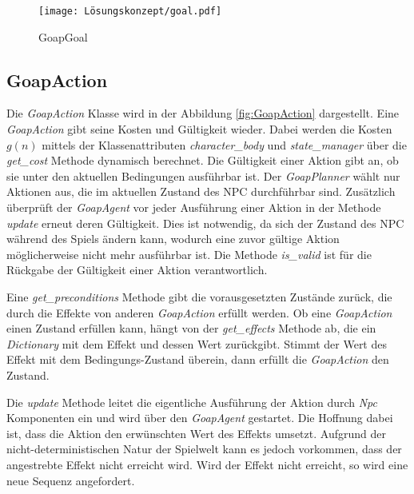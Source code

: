 \begin{figure}[t]
  \centering
  \texttt{[image: Lösungskonzept/goal.pdf]}
	\captionsetup{justification=justified, format=plain}
  \caption{GoapGoal}
  \label{fig:GoapGoal}
\end{figure}







\subsection{GoapAction}
\label{chap:goapaction uml}

Die \textit{GoapAction} Klasse wird in der Abbildung \ref{fig:GoapAction} dargestellt. Eine \textit{GoapAction} gibt seine Kosten und Gültigkeit wieder. Dabei werden die Kosten $g(n)$ mittels der Klassenattributen \textit{character\_body} und \textit{state\_manager} über die \textit{get\_cost} Methode dynamisch berechnet. Die Gültigkeit einer Aktion gibt an, ob sie unter den aktuellen Bedingungen ausführbar ist. Der \textit{GoapPlanner} wählt nur Aktionen aus, die im aktuellen Zustand des NPC durchführbar sind. Zusätzlich überprüft der \textit{GoapAgent} vor jeder Ausführung einer Aktion in der Methode \textit{update} erneut deren Gültigkeit. Dies ist notwendig, da sich der Zustand des NPC während des Spiels ändern kann, wodurch eine zuvor gültige Aktion möglicherweise nicht mehr ausführbar ist. Die Methode \textit{is\_valid} ist für die Rückgabe der Gültigkeit einer Aktion verantwortlich.

Eine \textit{get\_preconditions} Methode gibt die vorausgesetzten Zustände zurück, die durch die Effekte von anderen \textit{GoapAction} erfüllt werden. Ob eine \textit{GoapAction} einen Zustand erfüllen kann, hängt von der \textit{get\_effects} Methode ab, die ein \textit{Dictionary} mit dem Effekt und dessen Wert zurückgibt. Stimmt der Wert des Effekt mit dem Bedingungs-Zustand überein, dann erfüllt die \textit{GoapAction} den Zustand.

Die \textit{update} Methode leitet die eigentliche Ausführung der Aktion durch \textit{Npc} Komponenten ein und wird über den \textit{GoapAgent} gestartet. Die Hoffnung dabei ist, dass die Aktion den erwünschten Wert des Effekts umsetzt. Aufgrund der nicht-deterministischen Natur der Spielwelt kann es jedoch vorkommen, dass der angestrebte Effekt nicht erreicht wird. Wird der Effekt nicht erreicht, so wird eine neue Sequenz angefordert.

